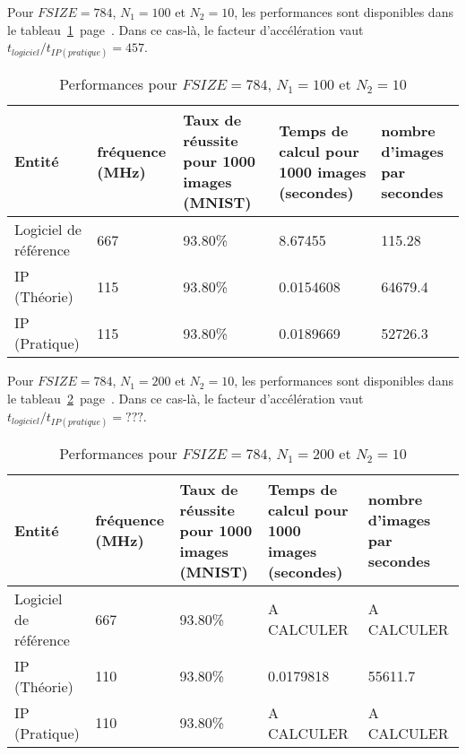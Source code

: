 Pour $FSIZE = 784$, $N_1 = 100$ et $N_2 = 10$, les performances sont disponibles
dans le tableau~\ref{fig:perf_100}~page~\pageref{fig:perf_100}.
Dans ce cas-là, le facteur d'accélération vaut $t_{logiciel}/t_{IP (pratique)} = 457$.\\
\begin{table}[h!]
	\centering
	\begin{tabular}{| p{} | p{} | p{} | p{} | p{} |}
		\hline
		Entité & fréquence (MHz) & Taux de réussite pour 1000 images (MNIST) & Temps de calcul pour 1000 images (secondes) & nombre d'images par secondes\\
		\hline
		Logiciel de référence & 667 & 93.80\% &  8.67455 & 115.28\\
		IP (Théorie) & 115 &  93.80\% & 0.0154608 & 64679.4\\
		IP (Pratique) & 115 &  93.80\% & 0.0189669 & 52726.3\\
		\hline
	\end{tabular}
	\caption{Performances pour $FSIZE = 784$, $N_1 = 100$ et $N_2 = 10$}
	\label{fig:perf_100}
\end{table}

Pour $FSIZE = 784$, $N_1 = 200$ et $N_2 = 10$, les performances sont disponibles
dans le tableau~\ref{fig:perf_200}~page~\pageref{fig:perf_200}.
Dans ce cas-là, le facteur d'accélération vaut $t_{logiciel}/t_{IP (pratique)} = ???$.\\
\begin{table}[h!]
	\centering
	\begin{tabular}{| p{} | p{} | p{} | p{} | p{} |}
	\hline
	Entité & fréquence (MHz) & Taux de réussite pour 1000 images (MNIST) & Temps de calcul pour 1000 images (secondes) & nombre d'images par secondes\\
	\hline
	Logiciel de référence & 667 & 93.80\% & A CALCULER & A CALCULER\\
	IP (Théorie) & 110 & 93.80\% & 0.0179818 & 55611.7\\
	IP (Pratique) & 110 & 93.80\% & A CALCULER & A CALCULER\\
	\hline
\end{tabular}
\caption{Performances pour $FSIZE = 784$, $N_1 = 200$ et $N_2 = 10$}
\label{fig:perf_200}
\end{table}
